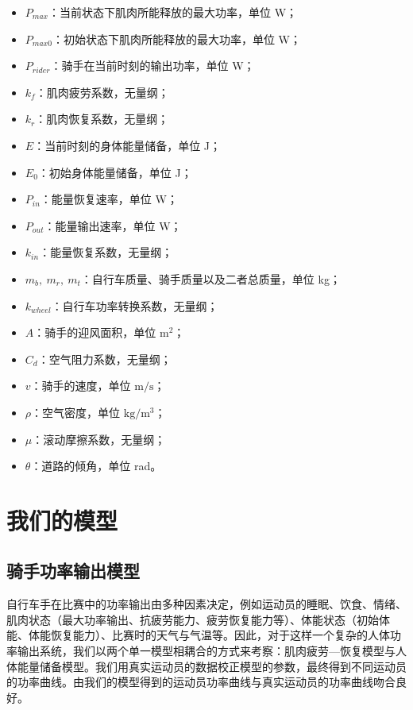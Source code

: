 \documentclass[11pt,a4paper]{ctexart}
\begin{document}
\begin{itemize}
\item $P_{max}$：当前状态下肌肉所能释放的最大功率，单位 W；
\item $P_{max0}$：初始状态下肌肉所能释放的最大功率，单位 W；
\item $P_{rider}$：骑手在当前时刻的输出功率，单位 W；
\item $k_f$：肌肉疲劳系数，无量纲；
\item $k_r$：肌肉恢复系数，无量纲；
\item $E$：当前时刻的身体能量储备，单位 J；
\item $E_0$：初始身体能量储备，单位 J；
\item $P_{in}$：能量恢复速率，单位 W；
\item $P_{out}$：能量输出速率，单位 W；
\item $k_{in}$：能量恢复系数，无量纲；
\item $m_b,\ m_r,\ m_t$：自行车质量、骑手质量以及二者总质量，单位 kg；
\item $k_{wheel}$：自行车功率转换系数，无量纲；
\item $A$：骑手的迎风面积，单位 $\mathrm{m^2}$；
\item $C_d$：空气阻力系数，无量纲；
\item $v$：骑手的速度，单位 $\mathrm{m/s}$；
\item $\rho$：空气密度，单位 $\mathrm{kg/m^3}$；
\item $\mu$：滚动摩擦系数，无量纲；
\item $\theta$：道路的倾角，单位 rad。
\end{itemize}

\section{我们的模型}

\subsection{骑手功率输出模型}

自行车手在比赛中的功率输出由多种因素决定，例如运动员的睡眠、饮食、情绪、肌肉状态（最大功率输出、抗疲劳能力、疲劳恢复能力等）、体能状态（初始体能、体能恢复能力）、比赛时的天气与气温等。因此，对于这样一个复杂的人体功率输出系统，我们以两个单一模型相耦合的方式来考察：肌肉疲劳—恢复模型与人体能量储备模型。我们用真实运动员的数据校正模型的参数，最终得到不同运动员的功率曲线。由我们的模型得到的运动员功率曲线与真实运动员的功率曲线吻合良好。
\end{document}

